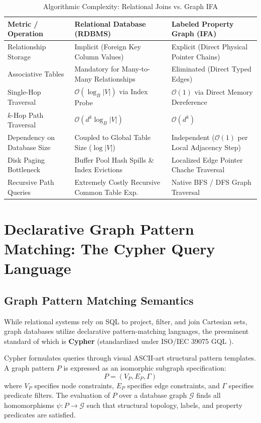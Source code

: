 \documentclass[10pt,twocolumn,letterpaper]{article}
\begin{document}
\begin{table}[htbp]
\centering
\small
\caption{Algorithmic Complexity: Relational Joins vs. Graph IFA}
\label{tab:complexity_comparison}
\begin{tabular}{@{}lll@{}}
\toprule
\textbf{Metric / Operation} & \textbf{Relational Database (RDBMS)} & \textbf{Labeled Property Graph (IFA)} \\
\midrule
Relationship Storage & Implicit (Foreign Key Column Values) & Explicit (Direct Physical Pointer Chains) \\
Associative Tables & Mandatory for Many-to-Many Relationships & Eliminated (Direct Typed Edges) \\
Single-Hop Traversal & $\mathcal{O}(\log_B |V|)$ via Index Probe & $\mathcal{O}(1)$ via Direct Memory Dereference \\
$k$-Hop Path Traversal & $\mathcal{O}(d^k \log_B |V|)$ & $\mathcal{O}(d^k)$ \\
Dependency on Database Size & Coupled to Global Table Size ($\log |V|$) & Independent ($\mathcal{O}(1)$ per Local Adjacency Step) \\
Disk Paging Bottleneck & Buffer Pool Hash Spills \& Index Evictions & Localized Edge Pointer Chache Traversal \\
Recursive Path Queries & Extremely Costly Recursive Common Table Exp. & Native BFS / DFS Graph Traversal \\
\bottomrule
\end{tabular}
\end{table}

\section{Declarative Graph Pattern Matching: The Cypher Query Language}
\label{sec:cypher}

\subsection{Graph Pattern Matching Semantics}
While relational systems rely on SQL to project, filter, and join Cartesian sets, graph databases utilize declarative pattern-matching languages, the preeminent standard of which is \textbf{Cypher} (standardized under ISO/IEC 39075 GQL \cite{gql2024}).

Cypher formulates queries through visual ASCII-art structural pattern templates. A graph pattern $P$ is expressed as an isomorphic subgraph specification:
\begin{equation}
P = (V_P, E_P, \Gamma)
\end{equation}
where $V_P$ specifies node constraints, $E_P$ specifies edge constraints, and $\Gamma$ specifies predicate filters. The evaluation of $P$ over a database graph $\mathcal{G}$ finds all homomorphisms $\psi: P \to \mathcal{G}$ such that structural topology, labels, and property predicates are satisfied.
\end{document}
